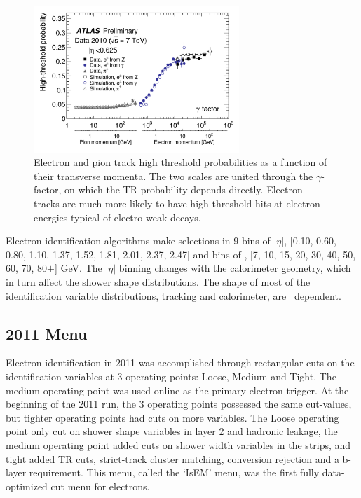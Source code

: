 \begin{figure}[!t]
\centering 
\includegraphics[width=0.69\textwidth]{figs/electron/TRFractionBarrel-eps-converted-to}
\caption{Electron and pion track high threshold probabilities as a function of their transverse momenta. The two scales are united through the $\gamma$-factor, on which the TR probability depends directly. Electron tracks are much more likely to have high threshold hits at electron energies typical of electro-weak decays.}  
\label{figure:electron_tr}
\end{figure}


Electron identification algorithms make selections in 9 bins of $|\eta|$, [0.10, 0.60, 0.80, 1.10. 1.37, 1.52, 1.81, 2.01, 2.37, 2.47] and bins of \pt, [7, 10, 15, 20, 30, 40, 50, 60, 70, 80$+$] GeV. The $|\eta|$ binning changes with the calorimeter geometry, which in turn affect the shower shape distributions. The shape of most of the identification variable distributions, tracking and calorimeter, are \pt\ dependent.  



\subsection{2011 Menu}

Electron identification in 2011 was accomplished through rectangular cuts on the identification variables at 3 operating points: Loose, Medium and Tight. The medium operating point was used online as the primary electron trigger. At the beginning of the 2011 run, the 3 operating points possessed the same cut-values, but tighter operating points had cuts on more variables. The Loose operating point only cut on shower shape variables in layer 2 and hadronic leakage, the medium operating point added cuts on shower width variables in the strips, and tight added TR cuts, strict-track cluster matching, conversion rejection and a b-layer requirement. This menu, called the `IsEM' menu, was the first fully data-optimized cut menu for electrons. 

